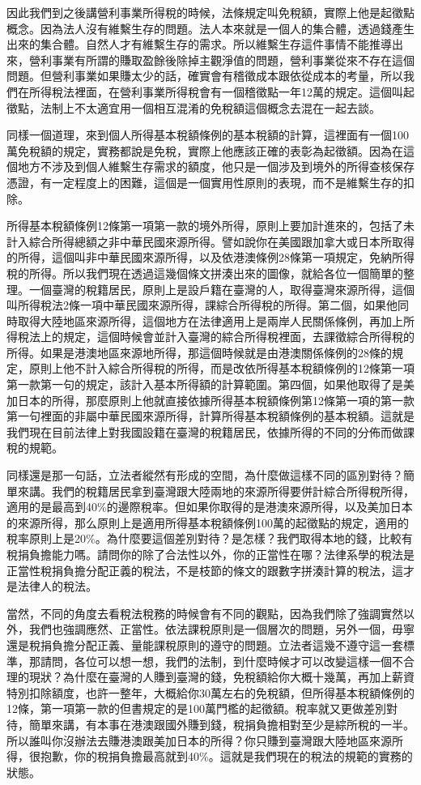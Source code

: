 \documentclass[]{ctexbook}
\begin{document}
因此我們到之後講營利事業所得稅的時候，法條規定叫免稅額，實際上他是起徵點概念。因為法人沒有維繫生存的問題。法人本來就是一個人的集合體，透過錢產生出來的集合體。自然人才有維繫生存的需求。所以維繫生存這件事情不能推導出來，營利事業有所謂的賺取盈餘後除掉主觀淨值的問題，營利事業從來不存在這個問題。但營利事業如果賺太少的話，確實會有稽徵成本跟依從成本的考量，所以我們在所得稅法裡面，在營利事業所得稅會有一個稽徵點一年12萬的規定。這個叫起徵點，法制上不太適宜用一個相互混淆的免稅額這個概念去混在一起去談。

同樣一個道理，來到個人所得基本稅額條例的基本稅額的計算，這裡面有一個100萬免稅額的規定，實務都說是免稅，實際上他應該正確的表彰為起徵額。因為在這個地方不涉及到個人維繫生存需求的額度，他只是一個涉及到境外的所得查核保存憑證，有一定程度上的困難，這個是一個實用性原則的表現，而不是維繫生存的扣除。

所得基本稅額條例12條第一項第一款的境外所得，原則上要加計進來的，包括了未計入綜合所得總額之非中華民國來源所得。譬如說你在美國跟加拿大或日本所取得的所得，這個叫非中華民國來源所得，以及依港澳條例28條第一項規定，免納所得稅的所得。所以我們現在透過這幾個條文拼湊出來的圖像，就給各位一個簡單的整理。一個臺灣的稅籍居民，原則上是設戶籍在臺灣的人，取得臺灣來源所得，這個叫所得稅法2條一項中華民國來源所得，課綜合所得稅的所得。第二個，如果他同時取得大陸地區來源所得，這個地方在法律適用上是兩岸人民關係條例，再加上所得稅法上的規定，這個時候會並計入臺灣的綜合所得稅裡面，去課徵綜合所得稅的所得。如果是港澳地區來源地所得，那這個時候就是由港澳關係條例的28條的規定，原則上他不計入綜合所得稅的所得，而是改依所得基本稅額條例的12條第一項第一款第一句的規定，該計入基本所得額的計算範圍。第四個，如果他取得了是美加日本的所得，那麼原則上他就直接依據所得基本稅額條例第12條第一項的第一款第一句裡面的非屬中華民國來源所得，計算所得基本稅額條例的基本稅額。這就是我們現在目前法律上對我國設籍在臺灣的稅籍居民，依據所得的不同的分佈而做課稅的規範。

同樣還是那一句話，立法者縱然有形成的空間，為什麼做這樣不同的區別對待？簡單來講。我們的稅籍居民拿到臺灣跟大陸兩地的來源所得要併計綜合所得稅所得，適用的是最高到40\%的邊際稅率。但如果你取得的是港澳來源所得，以及美加日本的來源所得，那么原則上是適用所得基本稅額條例100萬的起徵點的規定，適用的稅率原則上是20\%。為什麼要這個差別對待？是怎樣？我們取得本地的錢，比較有稅捐負擔能力嗎。請問你的除了合法性以外，你的正當性在哪？法律系學的稅法是正當性稅捐負擔分配正義的稅法，不是枝節的條文的跟數字拼湊計算的稅法，這才是法律人的稅法。

當然，不同的角度去看稅法稅務的時候會有不同的觀點，因為我們除了強調實然以外，我們也強調應然、正當性。依法課稅原則是一個層次的問題，另外一個，毋寧還是稅捐負擔分配正義、量能課稅原則的遵守的問題。立法者這幾不遵守這一套標準，那請問，各位可以想一想，我們的法制，到什麼時候才可以改變這樣一個不合理的現狀？為什麼在臺灣的人賺到臺灣的錢，免稅額給你大概十幾萬，再加上薪資特別扣除額度，也許一整年，大概給你30萬左右的免稅額，但所得基本稅額條例的12條，第一項第一款的但書規定的是100萬門檻的起徵額。稅率就又更做差別對待，簡單來講，有本事在港澳跟國外賺到錢，稅捐負擔相對至少是綜所稅的一半。所以誰叫你沒辦法去賺港澳跟美加日本的所得？你只賺到臺灣跟大陸地區來源所得，很抱歉，你的稅捐負擔最高就到40\%。這就是我們現在的稅法的規範的實務的狀態。
\end{document}
